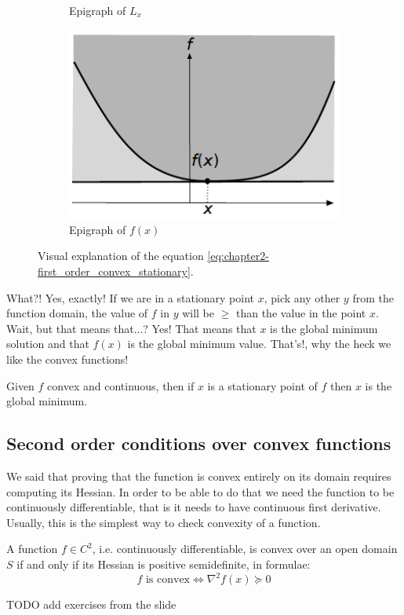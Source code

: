 \begin{figure}
\begin{subfigure}{0.31\textwidth}
    \caption{Epigraph of $L_x$} \label{fig:foc9}
    \end{subfigure}
    \begin{subfigure}{0.31\textwidth}
    \includegraphics[width=\linewidth]{figures/2/first-order-convex/91.png}
    \caption{Epigraph of $f(x)$} \label{fig:foc91}
    \end{subfigure}
    \caption{Visual explanation of the equation \ref{eq:chapter2-first_order_convex_stationary}.}
    \label{fig:chapter2-first_order_convex_stationary}
\end{figure}
\par What?! Yes, exactly! If we are in a stationary point $x$, pick any other $y$ from the function domain, the value of $f$ in $y$ will be $\geq$ than the value in the point $x$. Wait, but that means that...? Yes! That means that $x$ is the global minimum solution and that $f(x)$ is the global minimum value. That's!, why the heck we like the convex functions!
\begin{theorem}
    Given $f$ convex and continuous, then if $x$ is a stationary point of $f$ then $x$ is the global minimum.
\end{theorem}
%
\subsection{Second order conditions over convex functions}
\par We said that proving that the function is convex entirely on its domain requires computing its Hessian. In order to be able to do that we need the function to be continuously differentiable, that is it needs to have continuous first derivative. Usually, this is the simplest way to check convexity of a function.
\begin{theorem}
    A function $f \in C^2$, i.e. continuously differentiable, is convex over an open domain $S$ if and only if its Hessian is positive semidefinite, in formulae:
    \begin{equation}
        f \mbox{ is convex} \iff \nabla^2 f(x) \succeq 0
    \end{equation}
\end{theorem}
\par TODO add exercises from the slide
%

